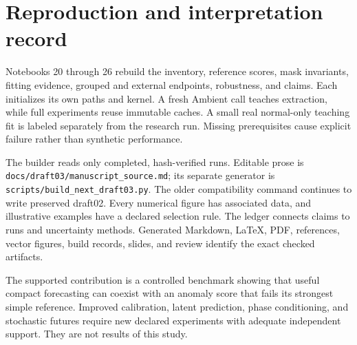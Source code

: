 \documentclass[letterpaper]{article}
\begin{document}
\section{Reproduction and interpretation record}

Notebooks 20 through 26 rebuild the inventory, reference scores, mask invariants, fitting evidence, grouped and external endpoints, robustness, and claims. Each initializes its own paths and kernel. A fresh Ambient call teaches extraction, while full experiments reuse immutable caches. A small real normal-only teaching fit is labeled separately from the research run. Missing prerequisites cause explicit failure rather than synthetic performance.

The builder reads only completed, hash-verified runs. Editable prose is \texttt{docs/draft03/manuscript\_source.md}; its separate generator is \texttt{scripts/build\_next\_draft03.py}. The older compatibility command continues to write preserved draft02. Every numerical figure has associated data, and illustrative examples have a declared selection rule. The ledger connects claims to runs and uncertainty methods. Generated Markdown, LaTeX, PDF, references, vector figures, build records, slides, and review identify the exact checked artifacts.

The supported contribution is a controlled benchmark showing that useful compact forecasting can coexist with an anomaly score that fails its strongest simple reference. Improved calibration, latent prediction, phase conditioning, and stochastic futures require new declared experiments with adequate independent support. They are not results of this study.
\end{document}
